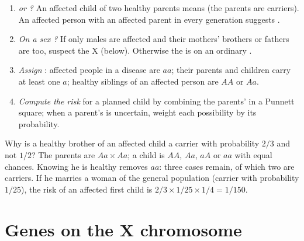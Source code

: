 \begin{method}\label{met:g11:genes-and-disease:analyse}
\begin{enumerate}
  \item \emph{ or ?} An affected child of two healthy
        parents means  (the parents are carriers). An
        affected person with an affected parent in every generation
        suggests .
  \item \emph{On a sex ?} If only males are affected and
        their mothers' brothers or fathers are too, suspect the X
         (below). Otherwise the  is on an ordinary
        .
  \item \emph{Assign }: affected people in a 
        disease are $aa$; their parents and children carry at least
        one $a$; healthy siblings of an affected person are $AA$ or
        $Aa$.
  \item \emph{Compute the risk} for a planned child by combining the
        parents'  in a Punnett square; when a parent's
         is uncertain, weight each possibility by its
        probability.
\end{enumerate}
\end{method}

\begin{example}\label{ex:g11:genes-and-disease:twothirds}
Why is a healthy brother of an affected child a carrier with
probability $2/3$ and not $1/2$? The parents are $Aa \times Aa$; a
child is $AA$, $Aa$, $aA$ or $aa$ with equal chances. Knowing he is
healthy removes $aa$: three cases remain, of which two are carriers.
If he marries a woman of the general population (carrier with
probability $1/25$), the risk of an affected first child is
$2/3 \times 1/25 \times 1/4 = 1/150$.
\end{example}

\section{Genes on the X chromosome}

